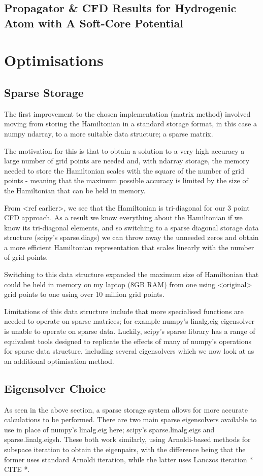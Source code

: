 \subsection{Propagator \& CFD Results for Hydrogenic Atom with A Soft-Core Potential}

\section{Optimisations}

\subsection{Sparse Storage}
The first improvement to the chosen implementation (matrix method) involved moving from storing the Hamiltonian in a standard storage format, in this case a numpy ndarray, to a more suitable data structure; a sparse matrix. 

The motivation for this is that to obtain a solution to a very high accuracy a large number of grid points are needed and, with ndarray storage, the memory needed to store the Hamiltonian scales with the square of the number of grid points - meaning that the maximum possible accuracy is limited by the size of the Hamiltonian that can be held in memory. 

From <ref earlier>, we see that the Hamiltonian is tri-diagonal for our 3 point CFD approach. As a result we know everything about the Hamiltonian if we know its tri-diagonal elements, and so switching to a sparse diagonal storage data structure (scipy's sparse.diags) we can throw away the unneeded zeros and obtain a more efficient Hamiltonian representation that scales linearly with the number of grid points. 

Switching to this data structure expanded the maximum size of Hamiltonian that could be held in memory on my laptop (8GB RAM) from one using <original> grid points to one using over 10 million grid points.

Limitations of this data structure include that more specialised functions are needed to operate on sparse matrices; for example numpy's linalg.eig eigensolver is unable to operate on sparse data. Luckily, scipy's sparse library has a range of equivalent tools designed to replicate the effects of many of numpy's operations for sparse data structure, including several eigensolvers which we now look at as an additional optimisation method.

\subsection{Eigensolver Choice}
As seen in the above section, a sparse storage system allows for more accurate calculations to be performed. There are two main sparse eigensolvers available to use in place of numpy's linalg.eig here; scipy's sparse.linalg.eigs and sparse.linalg.eigsh. These both work similarly, using Arnoldi-based methods for subspace iteration to obtain the eigenpairs, with the difference being that the former uses standard Arnoldi iteration, while the latter uses Lanczos iteration * CITE *. 

